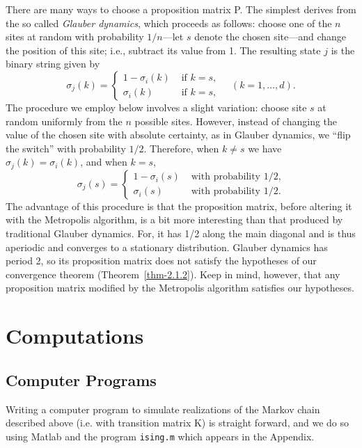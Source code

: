 There are many ways to choose a proposition matrix P. The simplest derives from the
so called \emph{Glauber dynamics}, which proceeds as follows: choose one of the
$n$ sites at random with probability $1/n$---let $s$ denote the chosen
site---and change the position of this site; i.e., subtract its value from 1.
The resulting state $j$ is the 
binary string
given by
\begin{equation*}
\sigma_j(k) = 
\begin{cases}
1-\sigma_i(k) & \text{ if $k =s$},\\
\sigma_i(k) & \text{ if $k =s$},
\end{cases}\quad (k = 1, \dots, d).
\end{equation*}
%
%
%
%
The procedure we employ below involves a slight variation: choose site $s$ at
random uniformly from the $n$ possible sites. However, instead of changing the
value of the chosen site with absolute certainty, as in Glauber dynamics, we
``flip the switch'' with probability $1/2$. 
Therefore, when $k \neq s$
we have $\sigma_j(k) = \sigma_i(k)$, and when $k = s$,
\begin{equation*}
\sigma_j(s) = 
\begin{cases}
1-\sigma_i(s) & \text{ with probability 1/2},\\
\sigma_i(s) & \text{ with probability 1/2}.
\end{cases}
\end{equation*}
The advantage of this procedure is that the proposition matrix, before altering
it with the Metropolis algorithm, is a bit more interesting than that produced
by traditional Glauber dynamics. For, it has 1/2 along the main diagonal and is
thus aperiodic and converges to a stationary distribution. Glauber dynamics has
period 2, so its proposition matrix does not satisfy the hypotheses of our
convergence theorem (Theorem~\ref{thm-2.1.2}). Keep in mind, however, that any
proposition matrix modified by the Metropolis algorithm satisfies our hypotheses.
\section{Computations}
\label{sec:computations}
\subsection{Computer Programs}
Writing a computer program to simulate realizations of the Markov chain described
above (i.e. with transition matrix K) is straight forward, and we do so using
Matlab and the program {\tt ising.m} which appears in the Appendix.

